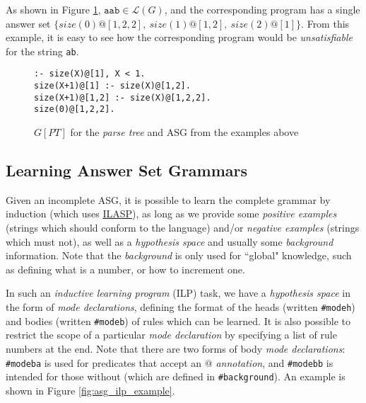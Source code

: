As shown in Figure \ref{fig:asg_tree_program_example}, $\texttt{aab} \in \mathcal{L}(G)$, and the corresponding program has a single answer set $\{size(0)@[1,2,2],\ size(1)@[1,2],\ size(2)@[1]\}$. From this example, it is easy to see how the corresponding program would be \textit{unsatisfiable} for the string \texttt{ab}.

\begin{figure}[H]
\centering
\texttt{:- size(X)@[1], X < 1. \\
           size(X+1)@[1] :- size(X)@[1,2]. \\
           size(X+1)@[1,2] :- size(X)@[1,2,2]. \\
           size(0)@[1,2,2].}
\caption{$G[PT]$ for the \textit{parse tree} and ASG from the examples above}
\label{fig:asg_tree_program_example}
\end{figure}

\subsection{Learning Answer Set Grammars}

Given an incomplete ASG, it is possible to learn the complete grammar by induction (which uses \href{http://www.ilasp.com}{ILASP}), as long as we provide some \textit{positive examples} (strings which should conform to the language) and/or \textit{negative examples}  (strings which must not), as well as a \textit{hypothesis space} and usually some \textit{background} information. Note that the \textit{background} is only used for ``global" knowledge, such as defining what is a number, or how to increment one. \cite{law_representing_2019}

In such an \textit{inductive learning program} (ILP) task, we have a \textit{hypothesis space} in the form of \textit{mode declarations}, defining the format of the heads (written \texttt{\#modeh}) and bodies (written \texttt{\#modeb}) of rules which can be learned. It is also possible to restrict the scope of a particular \textit{mode declaration} by specifying a list of rule numbers at the end. Note that there are two forms of body \textit{mode declarations}: \texttt{\#modeba} is used for predicates that accept an $@$ \textit{annotation}, and \texttt{\#modebb} is intended for those without (which are defined in \texttt{\#background}). An example is shown in Figure \ref{fig:asg_ilp_example}.

